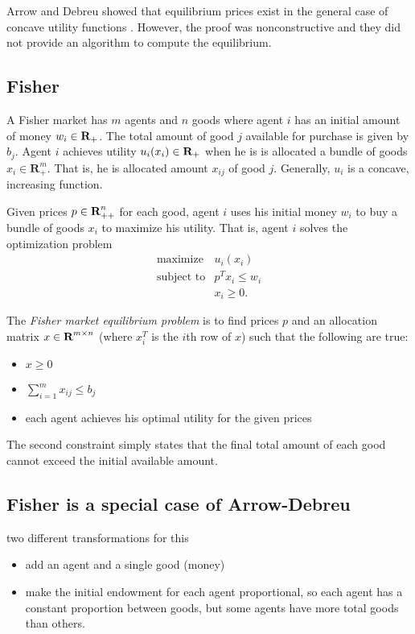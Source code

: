 \documentclass{article}
\begin{document}
Arrow and Debreu showed that equilibrium prices exist in the general case of concave utility functions \cite{arrow1954existence}. However, the proof was nonconstructive and they did not provide an algorithm to compute the equilibrium.



\subsection{Fisher}

A Fisher market has $m$ agents and $n$ goods where
agent $i$ has an initial amount of money $w_i \in {\mbox{\bf R}}_+$.
The total amount of good $j$ available for purchase is given by $b_j$.
Agent $i$ achieves utility $u_i(x_i) \in {\mbox{\bf R}}_+$ when he is is allocated a bundle of goods $x_i \in \mathbf{R}^m_{+}$. That is, he is allocated amount $x_{ij}$ of good $j$.
Generally, $u_i$ is a concave, increasing function.

Given prices $p \in {\mbox{\bf R}}^n_{++}$ for each good, agent $i$ uses his initial money $w_i$ to buy a bundle of goods $x_i$ to maximize his utility. That is, agent $i$ solves the optimization problem
\[
\begin{array}{ll}
\mbox{maximize} & u_i(x_i) \\
\mbox{subject to} & p^T x_i \leq w_i \\
& x_i \geq 0.
\end{array}
\]

The \emph{Fisher market equilibrium problem} is to find prices $p$ and an allocation matrix $x \in {\mbox{\bf R}}^{m \times n}$ (where $x_i^T$ is the $i$th row of $x$) such that the following are true:
\begin{itemize}
\item $x \geq 0$
\item $\sum_{i=1}^m x_{ij} \leq b_j$
\item each agent achieves his optimal utility for the given prices
\end{itemize}

The second constraint simply states that the final total amount of each good cannot exceed the initial available amount.



\subsection{Fisher is a special case of Arrow-Debreu}
two different transformations for this
\begin{itemize}
\item add an agent and a single good (money)
\item make the initial endowment for each agent proportional,
so each agent has a constant proportion between goods, but some agents have more total goods than others. 
\end{itemize}
\end{document}
